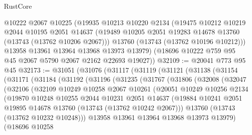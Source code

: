 \begin{lexlean}{RustCore}
\begin{coremodule}
      @10222
      @2067
      @10225
      (@19935
        @10213
        @10220
        @2134
        (@19475
          @10212
          @10219
          @2044
          @10195
          @2051
          @14637
          (@19489 @10205 @2051 @19283 @14678 @13760 (@13743 (@13762 @10206 @2067)))
          @13760
          (@13743 (@13762 @10196 @10212)))
        @13958
        @13961
        @13964
        @13968
        @13973
        @13979)
      (@18696 @10222 @759 @95 @45 @2067 @5790 @2067 @2162 @22693 @19027))
@32109 := @20041 @773 @95 @45
@32173 := @31051
    (@31076
      (@31117
        (@31119
          (@31121
            (@31138
              (@31154
                (@31171
                  (@31184
                    (@31192
                      (@31196
                        (@31235
                          (@31767
                            (@31806
                              (@32008
                                (@32047
                                  (@32106
                                    (@32109
                                      @10249
                                      @10258
                                      @2067
                                      @10261
                                      (@20051
                                        @10249
                                        @10256
                                        @2134
                                        (@19870
                                          @10248
                                          @10255
                                          @2044
                                          @10231
                                          @2051
                                          @14637
                                          (@19884
                                            @10241
                                            @2051
                                            @19895
                                            @14678
                                            @13760
                                            (@13743 (@13762 @10242 @2067)))
                                          @13760
                                          (@13743 (@13762 @10232 @10248)))
                                        @13958
                                        @13961
                                        @13964
                                        @13968
                                        @13973
                                        @13979)
                                      (@18696
                                        @10258

\end{coremodule}
\end{lexlean}
